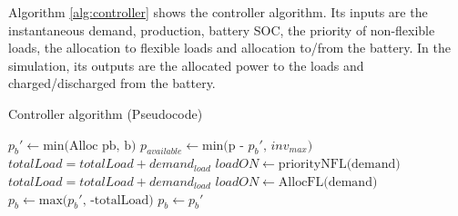 Algorithm \ref{alg:controller} shows the controller algorithm. Its inputs are the instantaneous demand, production, battery SOC, the priority of non-flexible loads, the allocation to flexible loads and allocation to/from the battery. In the simulation, its outputs are the allocated power to the loads and charged/discharged from the battery. 

\begin{algorithm}
\caption{Controller algorithm (Pseudocode)}\label{alg:controller}
\begin{algorithmic}
    \State$p_b'  \gets \text{min(Alloc pb, b)}$
    \State$p_{available}  \gets \text{min(p - $p_b'$, $inv_{max}$)}$               \\
    
            \State$totalLoad  = totalLoad + demand_{load}$
            \State$loadON  \gets \text{priorityNFL(demand)}$                    
        \EndIf
    \EndFor\\

            \State$totalLoad  = totalLoad + demand_{load}$
            \State$loadON  \gets \text{AllocFL(demand)}$                    
        \EndIf
    \EndFor\\
    
    \State$p_{b} \gets \text{max($p_b'$, -totalLoad)}$
\Else
    \State$p_{b} \gets p_b' $
\EndIf\\
\end{algorithmic}
\end{algorithm}